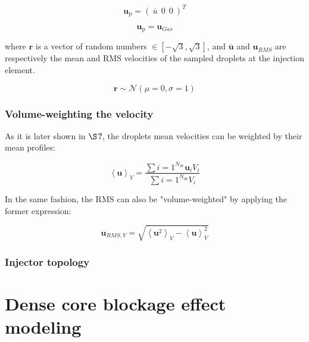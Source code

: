 \begin{equation}
\boldsymbol{u}_\mathrm{p} = \left( ~ \overline{u} ~~ 0 ~~ 0 ~ \right)^T
\end{equation}

\begin{equation}
\boldsymbol{u}_\mathrm{p}= \boldsymbol{u}_{Gas}
\end{equation}

where $\boldsymbol{r}$ is a vector of random numbers $\in [-\sqrt{3}, \sqrt{3}]$, and $\overline{\boldsymbol{u}}$ and $\boldsymbol{u}_{RMS}$ are respectively the mean and RMS velocities of the sampled droplets at the injection element.

\begin{equation}
\boldsymbol{r} \sim \mathcal{N} \left( \mu = 0, \sigma = 1 \right)
\end{equation}

\subsubsection*{Volume-weighting the velocity}

As it is later shown in $\S$\textbf{?}, the droplets mean velocities can be weighted by their mean profiles:

\begin{equation}
\displaystyle \left\langle \textbf{u} \right\rangle_V = \frac{\sum{i=1}^{N_\mathrm{dr}} \textbf{u}_i V_i}{\sum{i=1}^{N_\mathrm{dr}} V_i}
\end{equation}

In the same fashion, the RMS can also be "volume-weighted" by applying the former expression:

\begin{equation}
\textbf{u}_{RMS,V} = \sqrt{\displaystyle \left\langle \textbf{u}^2 \right\rangle_V - \displaystyle \left\langle \textbf{u} \right\rangle_V^2}
\end{equation}




\subsubsection*{Injector topology}



\section{Dense core blockage effect modeling}
	\label{sec:ch4_dense_core_modelling}
	
